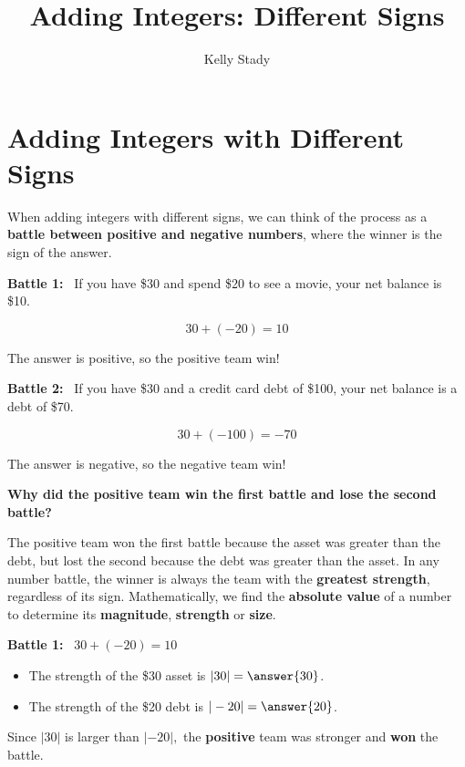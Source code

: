 \documentclass{ximera}[font=12pt]
\title{Adding Integers: Different Signs}   %
\author{Kelly Stady}
\begin{document}
\begin{abstract}

\end{abstract}

\maketitle
\label{xim:AddIntDiffSActivity}


\section*{Adding Integers with Different Signs}

When adding integers with different signs, we can think of the process as a
\textbf{battle between positive and negative numbers}, where the winner is the sign of
the answer.


\textcolor{accessibleOrange}{\textbf{Battle 1:}}  \ If you have \$30 and spend \$20 to see a movie, your net balance is \$10. 

\[ 30 + (-20) = 10 \]

The answer is positive, so the positive team win!


\textcolor{accessibleOrange}{\textbf{Battle 2:}} \ If you have \$30 and a credit card debt of \$100, your net balance is a debt of \$70.


\[ 30 + (-100) = -70 \]

The answer is negative, so the negative team win!

\textbf{Why did the positive team win the first battle and lose the second battle?}

The positive team won the first battle because the asset was greater than the debt, but 
lost the second because the debt was greater than the asset.  In any number battle, the winner is always 
the team with the \textbf{greatest strength}, regardless of its sign.  Mathematically, we find the \textbf{absolute value} 
of a number to determine its \textbf{magnitude}, \textbf{strength} or \textbf{size}.  


\textcolor{accessibleOrange}{\textbf{Battle 1:}} \ $30 + (-20) = 10$  
\begin{itemize}
    \item[] The strength of the \$30 asset is $|30| = \answer{30}$.
    \item[] The strength of the \$20 debt is $|-20| = \answer{20}$.
\end{itemize}


Since $|30|$ is larger than $|-20|,$ the \textbf{positive} team was stronger and \textbf{won} the battle.
\end{document}
